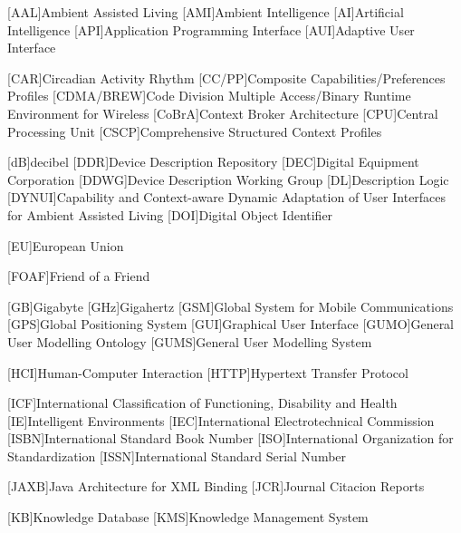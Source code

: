 \begin{acronym}[dynui]
  [AAL]{Ambient Assisted Living}
  [AMI]{Ambient Intelligence} %
  [AI]{Artificial Intelligence}
  [API]{Application Programming Interface}
  [AUI]{Adaptive User Interface}
  
  [CAR]{Circadian Activity Rhythm}
  [CC/PP]{Composite Capabilities/Preferences Profiles}
  [CDMA/BREW]{Code Division Multiple Access/Binary Runtime Environment for Wireless}
  [CoBrA]{Context Broker Architecture}
  [CPU]{Central Processing Unit}
  [CSCP]{Comprehensive Structured Context Profiles}
  
  [dB]{decibel}
  [DDR]{Device Description Repository}
  [DEC]{Digital Equipment Corporation}
  [DDWG]{Device Description Working Group}
  [DL]{Description Logic}
  [DYNUI]{Capability and Context-aware Dynamic Adaptation of User Interfaces for Ambient Assisted Living}
  [DOI]{Digital Object Identifier}
  
  [EU]{European Union}
  
  [FOAF]{Friend of a Friend}
  
  [GB]{Gigabyte}
  [GHz]{Gigahertz}
  [GSM]{Global System for Mobile Communications}
  [GPS]{Global Positioning System}
  [GUI]{Graphical User Interface}
  [GUMO]{General User Modelling Ontology}
  [GUMS]{General User Modelling System}
  
  [HCI]{Human-Computer Interaction}
  [HTTP]{Hypertext Transfer Protocol}
  
  [ICF]{International Classification of Functioning, Disability and Health}
  [IE]{Intelligent Environments}
  [IEC]{International Electrotechnical Commission}
  [ISBN]{International Standard Book Number}
  [ISO]{International Organization for Standardization}
  [ISSN]{International Standard Serial Number}
  
  [JAXB]{Java Architecture for XML Binding}
  [JCR]{Journal Citacion Reports}
  
  [KB]{Knowledge Database}
  [KMS]{Knowledge Management System}
  

\end{acronym}
